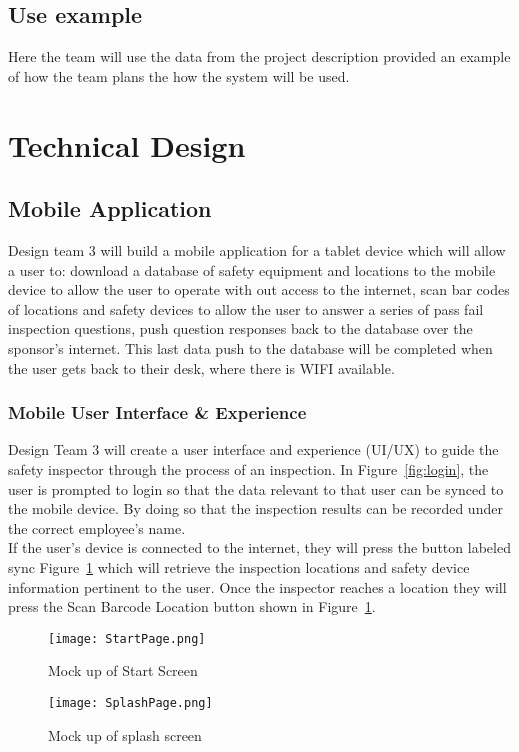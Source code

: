 \documentclass[Letter,11pt]{article}
\begin{document}
	\subsection{Use example}
		Here the team will use the data from the project description provided an example of how the team plans the how the system will be used.
		  
		


\section{Technical Design}

	\subsection{Mobile Application}
	Design team 3 will build a mobile application for a tablet device which will allow a user to: download a database of safety equipment and locations to the mobile device to allow the user to operate with out access to the internet, scan bar codes of locations and safety devices to allow the user to answer a series of pass fail inspection questions, push question responses back to the database over the sponsor's internet. This last data push to the database will be completed when the user gets back to their desk, where there is WIFI available.
	\subsubsection{Mobile User Interface \& Experience}
	Design Team 3 will create a user interface and experience (UI/UX) to guide the safety inspector through the process of an inspection. In  Figure~\ref{fig:login}, the user is prompted to login so that the data relevant to that user can be synced to the mobile device. By doing so that the inspection results can be recorded under the correct employee's name. \\
	If the user's device is connected to the internet, they will press the button labeled sync Figure~\ref{fig:splash} which will retrieve the inspection locations and safety device information pertinent to the user.
	Once the inspector reaches a location they will press the Scan Barcode Location button shown in Figure~\ref{fig:splash}.
	\begin{figure}[h]

		\begin{minipage}{0.5\textwidth}
			\centering
			\texttt{[image: StartPage.png]}
			\caption{\label{fig:login}Mock up of Start Screen}
		\end{minipage}%
		\begin{minipage}{0.5\textwidth}
			\centering
			\texttt{[image: SplashPage.png]}
			\caption{\label{fig:splash}Mock up of splash screen}
		\end{minipage}
	\end{figure}
\end{document}
